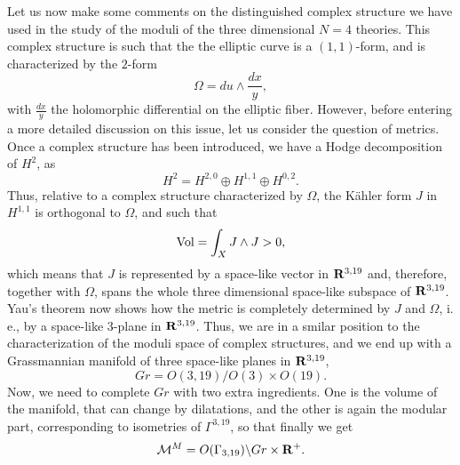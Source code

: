 Let us now make some comments on the distinguished complex
structure we have used in the study of the moduli of the three
dimensional $N\!=\!4$ theories. This complex structure is such
that the the elliptic curve is a $(1,1)$-form, and is
characterized by the $2$-form
\begin{equation}
\Omega = du \wedge \frac {dx}{y},
\label{eq:b22}
\end{equation}
with $\frac {dx}{y}$ the holomorphic differential on the elliptic
fiber. However, before entering a more detailed discussion on
this issue, let us consider the question of metrics. Once a
complex structure has been introduced, we have a Hodge
decomposition of $H^2$, as
\begin{equation}
H^2 = H^{2,0} \oplus H^{1,1} \oplus H^{0,2}.
\label{eq:b23}
\end{equation}
Thus, relative to a complex structure characterized by $\Omega$,
the K\"{a}hler form $J$ in $H^{1,1}$ is orthogonal to $\Omega$,
and such that
\begin{equation}
\hbox {Vol} = \int_X J \wedge J >0,
\label{eq:b24}
\end{equation}
which means that $J$ is represented by a space-like vector in
${\bf R}^{3,19}$ and, therefore, together with $\Omega$, spans
the whole three dimensional space-like subspace of ${\bf
R}^{3,19}$. Yau's theorem now shows how the metric is completely
determined by $J$ and $\Omega$, i. e., by a space-like $3$-plane
in ${\bf R}^{3,19}$. Thus, we are in a smilar position to the
characterization of the moduli space of complex structures, and
we end up with a Grassmannian manifold of three space-like planes
in ${\bf R}^{3,19}$,
\begin{equation}
Gr=O(3,19)/O(3) \times O(19).
\label{eq:b25}
\end{equation}
Now, we need to complete $Gr$ with two extra ingredients. One is
the volume of the manifold, that can change by dilatations, and
the other is again the modular part, corresponding to isometries
of $\Gamma^{3,19}$, so that finally we get
\begin{equation}
{\cal M}^{M} = O(\Gamma_{3,19})\backslash Gr \times {\bf R}^+.
\label{eq:b26}
\end{equation}




